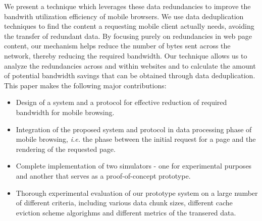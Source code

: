 



We present a technique which leverages these data redundancies to improve the bandwith utilization efficiency of mobile browsers. We use data deduplication 
techniques to find the content a requesting mobile client actually needs, avoiding the transfer of redundant data. By focusing purely on redundancies in web 
page content, our mechanism helps reduce the number of bytes sent across the network, thereby reducing the required bandwidth. Our technique allows us to analyze 
the redundancies across and within websites and to calculate the amount of potential bandwidth savings that can be obtained through data deduplication. This paper 
makes the following major contributions:
\begin{itemize}
\item Design of a system and a protocol for effective reduction of required bandwidth for mobile browsing.
\item Integration of the proposed system and protocol in data processing phase of mobile browsing, \textit{i.e.} the phase between the initial request for a page and
the rendering of the requested page.
\item Complete implementation of two simulators - one for experimental purposes and another that serves as a proof-of-concept prototype.
\item Thorough experimental evaluation of our prototype system on a large number of different criteria, including various data chunk sizes, different cache eviction scheme
algorighms and different metrics of the transered data.
\end{itemize}

